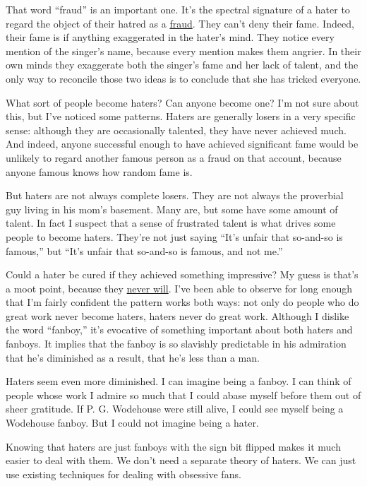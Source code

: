 \documentclass[12pt]{book}
\begin{document}
That word ``fraud'' is an important one. It's the spectral signature of
a hater to regard the object of their hatred as a
\href{https://twitter.com/search?q=Musk\%20fraud&src=typed_query&f=live}{fraud}.
They can't deny their fame. Indeed, their fame is if anything
exaggerated in the hater's mind. They notice every mention of the
singer's name, because every mention makes them angrier. In their own
minds they exaggerate both the singer's fame and her lack of talent, and
the only way to reconcile those two ideas is to conclude that she has
tricked everyone.

What sort of people become haters? Can anyone become one? I'm not sure
about this, but I've noticed some patterns. Haters are generally losers
in a very specific sense: although they are occasionally talented, they
have never achieved much. And indeed, anyone successful enough to have
achieved significant fame would be unlikely to regard another famous
person as a fraud on that account, because anyone famous knows how
random fame is.

But haters are not always complete losers. They are not always the
proverbial guy living in his mom's basement. Many are, but some have
some amount of talent. In fact I suspect that a sense of frustrated
talent is what drives some people to become haters. They're not just
saying ``It's unfair that so-and-so is famous,'' but ``It's unfair that
so-and-so is famous, and not me.''

Could a hater be cured if they achieved something impressive? My guess
is that's a moot point, because they \href{mean.html}{never will}. I've
been able to observe for long enough that I'm fairly confident the
pattern works both ways: not only do people who do great work never
become haters, haters never do great work. Although I dislike the word
``fanboy,'' it's evocative of something important about both haters and
fanboys. It implies that the fanboy is so slavishly predictable in his
admiration that he's diminished as a result, that he's less than a man.

Haters seem even more diminished. I can imagine being a fanboy. I can
think of people whose work I admire so much that I could abase myself
before them out of sheer gratitude. If P. G. Wodehouse were still alive,
I could see myself being a Wodehouse fanboy. But I could not imagine
being a hater.

Knowing that haters are just fanboys with the sign bit flipped makes it
much easier to deal with them. We don't need a separate theory of
haters. We can just use existing techniques for dealing with obsessive
fans.
\end{document}
